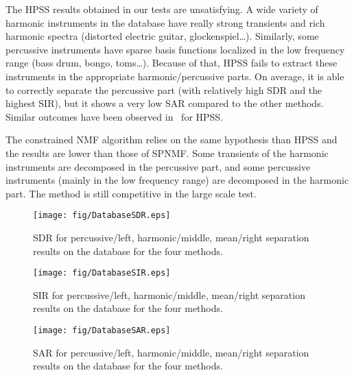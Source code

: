 The HPSS results obtained in our tests are unsatisfying. A wide variety of harmonic instruments in the database have really strong transients and rich harmonic spectra (distorted electric guitar, glockenspiel\ldots). Similarly, some percussive instruments have sparse basis functions localized in the low frequency range (bass drum, bongo, toms\ldots). Because of that, HPSS fails to extract these instruments in the appropriate harmonic/percussive parts. On average, it is able to correctly separate the percussive part (with relatively high SDR and the highest SIR), but it shows a very low SAR compared to the other methods. Similar outcomes have been observed in~\cite{canadas2014percussive} for HPSS.

The constrained NMF algorithm relies on the same hypothesis than HPSS and the results are lower than those of SPNMF. Some transients of the harmonic instruments are decomposed in the percussive part, and some percussive instruments (mainly in the low frequency range) are decomposed in the harmonic part. The method is still competitive in the large scale test. 



\begin{figure}[h]

  \centering 
  \texttt{[image: fig/DatabaseSDR.eps]}
  \caption{\label{DatabaseSDR} SDR for percussive/left, harmonic/middle, mean/right separation results on the database for the four methods.}
  
\end{figure}

\begin{figure}[h]

  \centering 
  \texttt{[image: fig/DatabaseSIR.eps]}
  \caption{\label{DatabaseSIR} SIR for percussive/left, harmonic/middle, mean/right separation results on the database for the four methods.}
  
\end{figure}

\begin{figure}[h]

  \centering 
  \texttt{[image: fig/DatabaseSAR.eps]}
  \caption{\label{DatabaseSAR} SAR for percussive/left, harmonic/middle, mean/right separation results on the database for the four methods.}
  
\end{figure}




